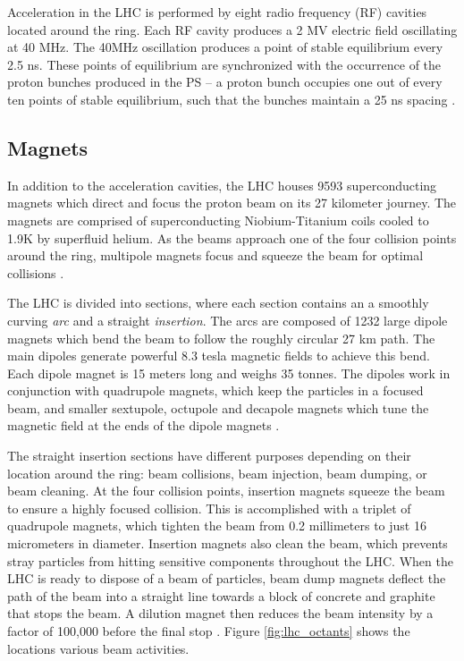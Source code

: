  Acceleration in the LHC is performed by eight radio frequency (RF) cavities located around the ring. Each RF cavity produces a 2 MV electric field oscillating at 40 MHz. The 40MHz oscillation produces a point of stable equilibrium every 2.5 ns. These points of equilibrium are synchronized with the occurrence of the proton bunches produced in the PS -- a proton bunch occupies one out of every ten points of stable equilibrium, such that the bunches maintain a 25 ns spacing \cite{lhc_faq}. \\

\subsection{Magnets}
In addition to the acceleration cavities, the LHC houses 9593 superconducting magnets which direct and focus the proton beam on its 27 kilometer journey. The magnets are comprised of superconducting Niobium-Titanium coils cooled to 1.9K by superfluid helium. As the beams approach one of the four collision points around the ring, multipole magnets focus and squeeze the beam for optimal collisions \cite{lhc_faq}.\par

The LHC is divided into sections, where each section contains an a smoothly curving \textit{arc} and a straight \textit{insertion}. The arcs are composed of 1232 large dipole magnets which bend the beam to follow the roughly circular 27 km path. The main dipoles generate powerful 8.3 tesla magnetic fields to achieve this bend. Each dipole magnet is 15 meters long and weighs 35 tonnes. The dipoles work in conjunction with quadrupole magnets, which keep the particles in a focused beam, and smaller sextupole, octupole and decapole magnets which tune the magnetic field at the ends of the dipole magnets \cite{lhc_magnets}.\par

The straight insertion sections have different purposes depending on their location around the ring: beam collisions, beam injection, beam dumping, or beam cleaning. At the four collision points, insertion magnets squeeze the beam to ensure a highly focused collision. This is accomplished with a triplet of quadrupole magnets, which tighten the beam from 0.2 millimeters to just 16 micrometers in diameter. Insertion magnets also clean the beam, which prevents stray particles from hitting sensitive components throughout the LHC. When the LHC is ready to dispose of a beam of particles, beam dump magnets deflect the path of the beam into a straight line towards a block of concrete and graphite that stops the beam. A dilution magnet then reduces the beam intensity by a factor of 100,000 before the final stop \cite{lhc_magnets}. Figure \ref{fig:lhc_octants} shows the locations various beam activities.\par

